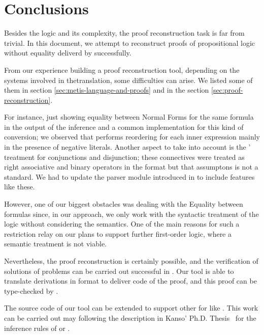 \documentclass[main.tex]{subfiles}
\begin{document}

\section{Conclusions}
\label{sec:conclusions}

Besides the logic and its complexity, the proof reconstruction task is
far from trivial. In this document, we attempt to reconstruct proofs
of propositional logic without equality deliverd by \Metis successfully.

From our experience building a proof reconstruction tool, depending on
the systems involved in thetranslation, some difficulties can arise.
We listed some of them in section \ref{sec:metis-language-and-proofs}
and in the section \ref{sec:proof-reconstruction}.

For instance, just showing equality between Normal Forms for the
same formula in the output of the \canonicalize inference and a
common implementation for this kind of conversion; we observed that
\Metis performs reordering for each inner expression mainly in the
presence of negative literals. Another aspect to take into account
is the \Metis' treatment for conjunctions and disjunction;
these connectives were treated as right associative and binary
operators in the \TSTP format but that assumptons is not a standard.
We had to update the \TSTP parser module introduced in
\cite{Gomez-Londono2015} to include features like these.

However, one of our biggest obstacles
was dealing with
the Equality between formulas since, in our approach, we only work
with the syntactic treatment of the logic without considering the
semantics.
One of the main reasons for such a restriction relay on our plans to
support further first-order logic, where a semantic treatment is not
viable.

Nevertheless, the proof reconstruction is certainly possible, and
the verification of solutions of \CPL problems can be carried out
successful in \Agda. Our tool is able to translate \Metis
derivations in \TSTP format to deliver \Agda code of the proof,
and this proof can be type-checked by \Agda.

The source code of our tool can be extended to support
other \ATPs for \CPL like . This work can be carried out
may following the description in Kanso' Ph.D. Thesis~\cite{Kanso2012}
for the inference rules of  or .
\end{document}

